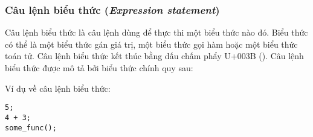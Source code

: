 \subsubsection{Câu lệnh biểu thức (\textit{Expression statement})}            
\label{ch2:expr_stmt}
    Câu lệnh biểu thức là câu lệnh dùng để thực thi một biểu thức nào đó. Biểu thức có thể là một biểu thức gán giá trị, một biểu thức gọi hàm hoặc một biểu thức toán tử. Câu lệnh biểu thức kết thúc bằng dấu chấm phẩy U+003B (\kw{;}). Câu lệnh biểu thức được mô tả bởi biểu thức chính quy sau:

\regexexprstmt

\noindent Ví dụ về câu lệnh biểu thức:
\begin{lstlisting}[]
5;
4 + 3;
some_func();
\end{lstlisting}
